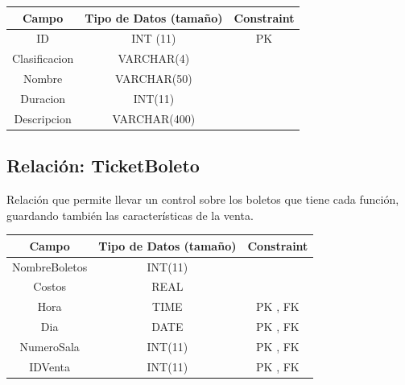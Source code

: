 \documentclass[12pt, fleqn]{report}                             %
\begin{document}
            \small{
            \begin{tabular}{| c | c | c |}
                \hline
                \textbf{Campo} & \textbf{Tipo de Datos (tamaño)} & \textbf{Constraint} \\[0.5ex] 
                \hline\hline
                
                ID              & INT (11)         & PK                        \\
                Clasificacion   & VARCHAR(4)       &                           \\
                Nombre          & VARCHAR(50)      &                           \\
                Duracion        & INT(11)          &                           \\
                Descripcion     & VARCHAR(400)     &                           \\
                \hline
            \end{tabular}
            }



        \clearpage
        \subsection*{Relación: TicketBoleto}

            Relación que permite llevar un control sobre los boletos que tiene
            cada función, guardando también las características de la venta.

            \vspace{2em}

            \small{
            \begin{tabular}{| c | c | c |}
                \hline
                \textbf{Campo} & \textbf{Tipo de Datos (tamaño)} & \textbf{Constraint} \\[0.5ex] 
                \hline\hline
                
                NombreBoletos   & INT(11)    &                           \\
                Costos          & REAL       &                           \\
                Hora            & TIME       & PK , FK                   \\
                Dia             & DATE       & PK , FK                   \\
                NumeroSala      & INT(11)    & PK , FK                   \\
                IDVenta         & INT(11)    & PK , FK                   \\
                \hline
            \end{tabular}
            }
\end{document}
